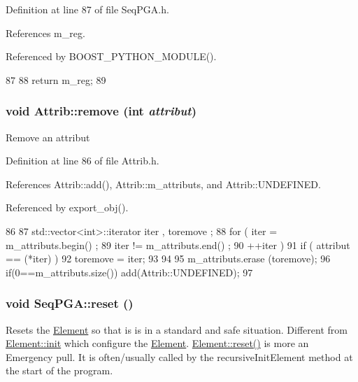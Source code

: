 Definition at line 87 of file SeqPGA.h.

References m\_\-reg.

Referenced by BOOST\_\-PYTHON\_\-MODULE().


\begin{DoxyCode}
87                  {
88     return m_reg;
89   }
\end{DoxyCode}
\hypertarget{classAttrib_a7d4ef7e32d93cb287792b87b857e79f3}{
\subsubsection[{remove}]{\setlength{\rightskip}{0pt plus 5cm}void Attrib::remove (int {\em attribut})}}
\label{classAttrib_a7d4ef7e32d93cb287792b87b857e79f3}
Remove an attribut 

Definition at line 86 of file Attrib.h.

References Attrib::add(), Attrib::m\_\-attributs, and Attrib::UNDEFINED.

Referenced by export\_\-obj().


\begin{DoxyCode}
86                                {
87     std::vector<int>::iterator iter , toremove ;
88     for ( iter  = m_attributs.begin() ;
89           iter != m_attributs.end()   ;
90           ++iter ) {
91       if ( attribut == (*iter) ) {
92         toremove = iter;
93       }
94     }
95     m_attributs.erase (toremove);
96     if(0==m_attributs.size()) add(Attrib::UNDEFINED);
97   }
\end{DoxyCode}
\hypertarget{classSeqPGA_aaadcbdd7ad7c96d2d69549b820da6809}{
\subsubsection[{reset}]{\setlength{\rightskip}{0pt plus 5cm}void SeqPGA::reset ()}}
\label{classSeqPGA_aaadcbdd7ad7c96d2d69549b820da6809}
Resets the \hyperlink{classElement}{Element} so that is is in a standard and safe situation. Different from \hyperlink{classElement_af42754b5cabc198869222725218d695c}{Element::init} which configure the \hyperlink{classElement}{Element}. \hyperlink{classElement_a69efffa22f06909d768149715565cb56}{Element::reset()} is more an Emergency pull. It is often/usually called by the recursiveInitElement method at the start of the program. 

